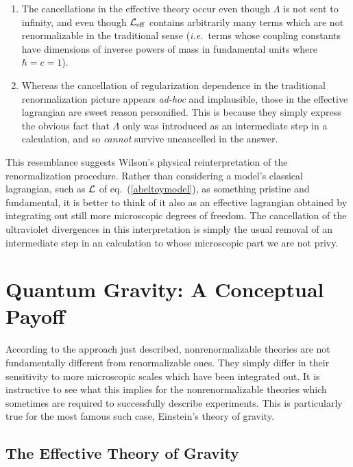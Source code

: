 \documentclass[12pt]{article}
\def\pref#1{(\ref{#1})}
\def\ie{{\it i.e.}}
\begin{document}
\begin{enumerate}
\item
The cancellations in the effective theory occur even though
$\Lambda$ is not sent to infinity, and even though 
${\cal L}_{\rm eff}$ contains arbitrarily many terms which
are not renormalizable in the traditional sense (\ie\ terms
whose coupling constants have dimensions of inverse powers
of mass in fundamental units where $\hbar =  c = 1$). 
%
\item
Whereas the cancellation of regularization dependence
in the traditional renormalization picture appears {\it ad-hoc}
and implausible, those in the effective lagrangian are sweet
reason personified. This is because they simply
express the obvious fact that $\Lambda$ only was introduced
as an intermediate step in a calculation, and so {\sl cannot}
survive uncancelled in the answer. 
\end{enumerate}

This resemblance suggests Wilson's physical reinterpretation of
the renormalization procedure. Rather than considering a model's
classical lagrangian, such as ${\cal L}$ of eq.~\pref{abeltoymodel}, 
as something pristine and fundamental, it is
better to think of it also as an effective lagrangian obtained
by integrating out still more microscopic degrees of freedom. 
The cancellation of the ultraviolet divergences in this interpretation
is simply the usual removal of an intermediate step in an
calculation to whose microscopic part we are not privy.

\section{Quantum Gravity: A Conceptual Payoff}

According to the approach just described, nonrenormalizable
theories are not fundamentally different from renormalizable
ones. They simply differ in their sensitivity to more microscopic
scales which have been integrated out. It is instructive to 
see what this implies for the nonrenormalizable theories which
sometimes are required to successfully describe experiments.
This is particularly true for the most famous such case, 
Einstein's theory of gravity. 

\subsection{The Effective Theory of Gravity}
\end{document}
